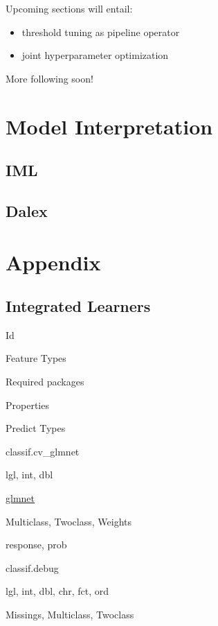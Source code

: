 \documentclass[]{article}
\providecommand{\tightlist}{%
  \setlength{\itemsep}{0pt}\setlength{\parskip}{0pt}}
\begin{document}
Upcoming sections will entail:

\begin{itemize}
\tightlist
\item
  threshold tuning as pipeline operator
\item
  joint hyperparameter optimization
\end{itemize}

More following soon!

\hypertarget{interpretation}{%
\section{Model Interpretation}\label{interpretation}}

\hypertarget{iml}{%
\subsection{IML}\label{iml}}

\hypertarget{dalex}{%
\subsection{Dalex}\label{dalex}}

\hypertarget{appendix}{%
\section{Appendix}\label{appendix}}

\hypertarget{list-learners}{%
\subsection{Integrated Learners}\label{list-learners}}

Id

Feature Types

Required packages

Properties

Predict Types

classif.cv\_glmnet

lgl, int, dbl

\href{https://cran.r-project.org/package=glmnet}{glmnet}

Multiclass, Twoclass, Weights

response, prob

classif.debug

lgl, int, dbl, chr, fct, ord

Missings, Multiclass, Twoclass
\end{document}
